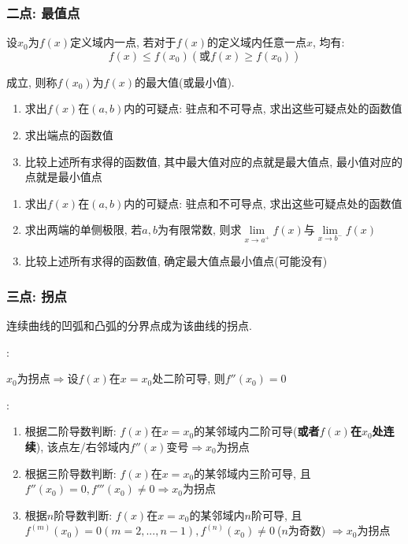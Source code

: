 \subsubsection{二点: 最值点}
设$ x_{0} $为$ f(x) $定义域内一点, 若对于$ f(x) $的定义域内任意一点$ x $, 均有:
\begin{equation*}
f(x)\le f(x_{0})(\text{或}f(x)\ge f(x_{0}))
\end{equation*}\par
成立, 则称$ f(x_{0}) $为$ f(x) $的最大值(或最小值).\par \vspace{.5em}
\begin{enumerate}
\item 求出$ f(x) $在$ (a,b) $内的可疑点: 驻点和不可导点, 求出这些可疑点处的函数值
\item 求出端点的函数值
\item 比较上述所有求得的函数值, 其中最大值对应的点就是最大值点, 最小值对应的点就是最小值点
\end{enumerate}
\begin{enumerate}
\item 求出$ f(x) $在$ (a,b) $内的可疑点: 驻点和不可导点, 求出这些可疑点处的函数值
\item 求出两端的单侧极限, 若$ a,b $为有限常数, 则求$ \lim\limits_{x\rightarrow a^{+}}f(x) $与$ \lim\limits_{x\rightarrow b^{-}}f(x) $
\item 比较上述所有求得的函数值, 确定最大值点最小值点(可能没有)
\end{enumerate}
\subsubsection{三点: 拐点}
连续曲线的凹弧和凸弧的分界点成为该曲线的拐点.\par \vspace{.5em}
: \par \vspace{.5em}
$ x_{0} $为拐点$ \Rightarrow $设$ f(x) $在$ x=x_{0} $处二阶可导, 则$ f''(x_{0})=0 $ \par \vspace{.5em}
:
\begin{enumerate}
\item 根据二阶导数判断: $ f(x) $在$ x=x_{0} $的某邻域内二阶可导(\textbf{或者$ f(x) $在$ x_{0} $处连续}), 该点左/右邻域内$ f''(x) $变号$ \Rightarrow x_{0}$为拐点
\item 根据三阶导数判断: $ f(x) $在$ x=x_{0} $的某邻域内三阶可导, 且$ f''(x_{0})=0, f'''(x_{0})\neq 0 $$ \Rightarrow x_{0}$为拐点
\item 根据$ n $阶导数判断: $ f(x) $在$ x=x_{0} $的某邻域内$ n $阶可导, 且$ f^{(m)}(x_{0})=0(m=2,...,n-1), f^{(n)}(x_{0})\neq 0\  $($ n $为奇数) $ \Rightarrow x_{0}$为拐点
\end{enumerate}
